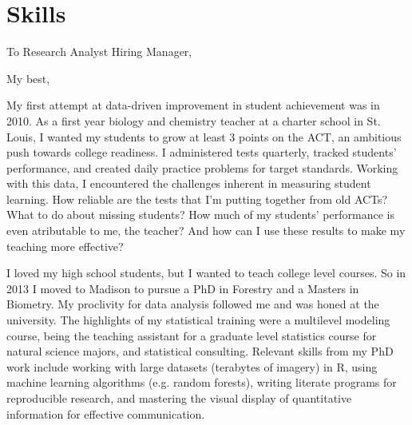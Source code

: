 \documentclass[11pt, sans]{moderncv}
\begin{document}
\section*{Skills}
\label{sec:org5de9a47}

\clearpage
{}
\date{\today}
\opening{To Research Analyst Hiring Manager,}
\closing{My best,}
\makelettertitle

My first attempt at data-driven improvement in student achievement was
in 2010.  As a first year biology and chemistry teacher at a charter
school in St. Louis, I wanted my students to grow at least 3 points on
the ACT, an ambitious push towards college readiness.  I administered
tests quarterly, tracked students' performance, and created daily
practice problems for target standards.  Working with this data, I
encountered the challenges inherent in measuring student learning.
How reliable are the tests that I'm putting together from old ACTs?
What to do about missing students?  How much of my students'
performance is even atributable to me, the teacher?  And how can I use
these results to make my teaching more effective?

I loved my high school students, but I wanted to teach college level
courses.  So in 2013 I moved to Madison to pursue a PhD in Forestry
and a Masters in Biometry.  My proclivity for data analysis followed
me and was honed at the university.  The highlights of my statistical
training were a multilevel modeling course, being the teaching
assistant for a graduate level statistics course for natural science
majors, and statistical consulting.  Relevant skills from my PhD work
include working with large datasets (terabytes of imagery) in R, using
machine learning algorithms (e.g. random forests), writing literate
programs for reproducible research, and mastering the visual display
of quantitative information for effective communication.
\end{document}
